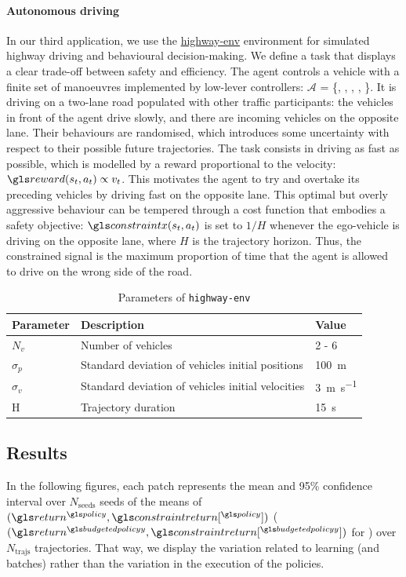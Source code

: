 \paragraph{Autonomous driving}
In our third application, we use the \href{https://github.com/eleurent/highway-env}{highway-env} environment \citep{highway-env} for simulated highway driving and behavioural decision-making.
We define a task that displays a clear trade-off between safety and efficiency. The agent controls a vehicle with a finite set of manoeuvres implemented by low-lever controllers: $\mathcal{A}$ = \{, , , , \}. It is driving on a two-lane road populated with other traffic participants: the vehicles in front of the agent drive slowly, and there are incoming vehicles on the opposite lane. Their behaviours are randomised, which introduces some uncertainty with respect to their possible future trajectories.
The task consists in driving as fast as possible, which is modelled by a reward proportional to the velocity: $\R(s_t, a_t) \propto v_t$. This motivates the agent to try and overtake its preceding vehicles by driving fast on the opposite lane. This optimal but overly aggressive behaviour can be tempered through a cost function that embodies a safety objective: $\constraint(s_t, a_t)$ is set to $1/H$ whenever the ego-vehicle is driving on the opposite lane, where $H$ is the trajectory horizon. Thus, the constrained signal is the maximum proportion of time that the agent is allowed to drive on the wrong side of the road.

\begin{table}[ht!]
    \centering
    \begin{tabular}{lll}
        \toprule
        Parameter & Description & Value\tabularnewline
        \midrule
        $N_v$& Number of vehicles & 2 - 6\tabularnewline
        $\sigma_p$& Standard deviation of vehicles initial positions & \SI{100}{\meter}\tabularnewline
        $\sigma_v$& Standard deviation of vehicles initial velocities & \SI{3}{\meter\per\second}\tabularnewline
        H & Trajectory duration & \SI{15}{\second}\tabularnewline
        \bottomrule
    \end{tabular}

    \caption{Parameters of \texttt{highway-env}}
    \label{tab:param-highway-env}
\end{table}

\subsection{Results}
\label{subsec:results}
In the following figures, each patch represents the mean and 95\% confidence interval over $N_{\text{seeds}}$ seeds of the means of $(\return^{\policy},\constraintreturn[^{\policy}])$ ($(\return^{\budgetedpolicy},\constraintreturn[^{\budgetedpolicy}])$ for \BFTQ) over $N_\text{trajs}$ trajectories. That way, we display the variation related to learning (and batches) rather than the variation in the execution of the policies.

